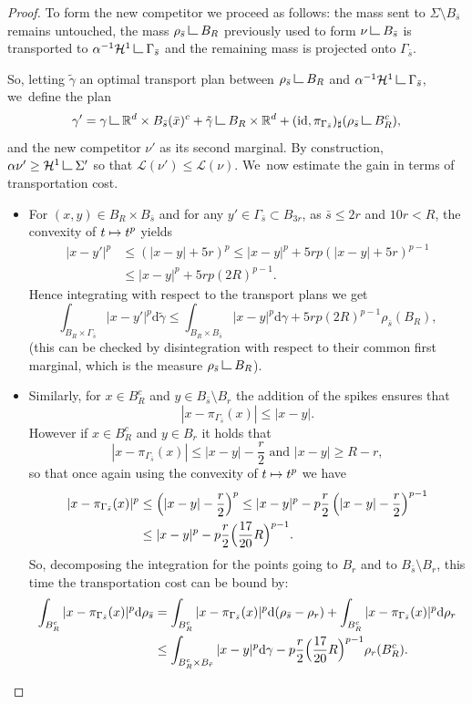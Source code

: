 \documentclass[JEP,XML,SOM,Unicode,NoFloatCountersInSection,published]{cedram}
\newcommand\mto{\mathchoice{\longmapsto}{\mapsto}{\mapsto}{\mapsto}}
\theoremstyle{definition}
\newcommand\LM[1]{\hbox{\vrule width.5pt \vbox to#1pt{\vfill \hrule width#1pt height.5pt}}}
\newcommand\LL{{\mathchoice {\>\LM7\>}{\>\LM7\>}{\,\LM5\,}{\,\LM{3.35}\,}}}
\newcommand{\mres}{\LL}
\newcommand\cH{\mathcal{H}}
\newcommand{\RR}{\mathbb{R}}
\newcommand\dd{\mathrm{d}}
\begin{document}
\begin{proof}
To form the new competitor we proceed as follows: the mass sent to $\Sigma\setminus B_{\bar s}$ remains untouched, the mass $\rho_{\bar s}\mres B_R$ previously used to form $\nu\mres B_{\bar s}$ is transported to $\alpha^{-1}\cH^1\mres \Gamma_{\bar s}$ and the remaining mass is projected onto $\Gamma_{\bar s}$.

So, letting $\tilde \gamma$ an optimal transport plan between $\rho_{\bar s}\mres B_R$ and $\alpha^{-1}\cH^1\mres \Gamma_{\bar s}$, we~define the plan
\[
\gamma' =
\gamma\mres \RR^d\times B_{\bar s}(\bar x)^c
+
\tilde \gamma\mres B_R\times\RR^d
+
(\text{id}, \pi_{\Gamma_{\bar s}})_\sharp(\rho_{\bar s}\mres B_R^c),
\]
and the new competitor $\nu'$ as its second marginal. By construction, $\alpha\nu' \ge \cH^1\mres \Sigma'$ so that $\mathcal{L}(\nu') \le \mathcal{L}(\nu)$. We~now estimate the gain in terms of transportation cost.
\begin{itemize}
\item For $(x,y)\in B_R\times B_{\bar s}$ and for any $y' \in \Gamma_{\bar s}\subset B_{3r}$, as $\bar s\le 2r$ and $10r < R$, the convexity of $t \mto t^p$ yields
\begin{align*}
|x - y'|^p
&\le
\left(|x - y| + 5r\right)^p
\le
|x - y|^p
+
5rp
\left(|x - y|+5r\right)^{p-1} \\
&\le
|x - y|^p
+
5rp {{\left(2R\right)^{p-1}}}.
\end{align*}
Hence integrating with respect to the transport plans we get
\[
\int_{B_R\times\Gamma_{\bar s}}|x - y'|^p \dd \tilde \gamma
\le
\int_{B_R\times B_{\bar s}}|x - y|^p \dd \gamma
+
5rp
\left({2R}\right)^{p-1}\rho_{\bar s}(B_R),
\]
(this can be checked by disintegration with respect to their common first marginal, which is the measure $\rho_{\bar s}\mres B_R$).
\item
Similarly, for $x \in B_R^c$ and $y \in B_{\bar s}\setminus B_r$ the addition of the spikes ensures that
\[
|x - \pi_{\Gamma_{\bar s}}(x)| \le |x - y|.
\]
However if $x \in B_R^c$ and $y \in B_r$ it holds that
\[
|x - \pi_{\Gamma_{\bar s}}(x)| \le |x - y| - \frac{r}{2}
\text{ and }
|x - y| \ge R - r,
\]
so that once again using the convexity of $t\mto t^p$ we have
\begin{align*}
|x - \pi_{\Gamma_{\bar s}}(x)|^p
&\le
\left(|x - y| -\frac{r}{2}\right)^p
\le
|x - y|^p
-
p\frac{r}{2}
\left(|x - y|-\frac{r}{2}\right)^{p-1}\\
&\le
|x - y|^p
-
p\frac{r}{2}
\Bigl(\frac{17}{20}R\Bigr)^{p-1}.
\end{align*}
So, decomposing the integration for the points going to $B_r$ and to $B_{\bar s}\setminus B_r$, this time the transportation cost can be bound by:
\begin{align*}
\int_{B_R^c}
|x - \pi_{\Gamma_{\bar s}}(x)|^p \dd \rho_{\bar s}
&=
\int_{B_R^c}
|x - \pi_{\Gamma_{\bar s}}(x)|^p \dd (\rho_{\bar s} -\rho_{r})
+
\int_{B_R^c}
|x - \pi_{\Gamma_{\bar s}}(x)|^p \dd \rho_{r}\\
&\le
\int_{B_R^c\times B_{\bar r}}|x - y|^p \dd \gamma
-
p\frac{r}{2}
\Bigl(\frac{17}{20}R\Bigr)^{p-1}\rho_r(B_R^c).
\end{align*}
\end{itemize}


\end{proof}
\end{document}

